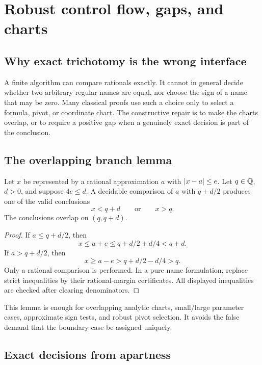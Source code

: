 \section{Robust control flow, gaps, and charts}
\label{sec:control}

\subsection{Why exact trichotomy is the wrong interface}

A finite algorithm can compare rationals exactly.  It cannot in general decide
whether two arbitrary regular names are equal, nor choose the sign of a name
that may be zero.  Many classical proofs use such a choice only to select a
formula, pivot, or coordinate chart.  The constructive repair is to make the
charts overlap, or to require a positive gap when a genuinely exact decision
is part of the conclusion.

\subsection{The overlapping branch lemma}

\begin{theorem}
\label{thm:overlap-branch}
Let \(x\) be represented by a rational approximation \(a\) with
\(\left|x-a\right|\le e\).  Let \(q\in\mathbb Q\), \(d>0\), and suppose \(4e\le d\).
A decidable comparison of \(a\) with \(q+d/2\) produces one of the valid
conclusions
\[
 x<q+d\qquad\text{or}\qquad x>q.
\]
The conclusions overlap on \((q,q+d)\).
\end{theorem}

\begin{proof}
If \(a\le q+d/2\), then
\[
 x\le a+e\le q+d/2+d/4<q+d.
\]
If \(a>q+d/2\), then
\[
 x\ge a-e>q+d/2-d/4>q.
\]
Only a rational comparison is performed.  In a pure name formulation, replace
strict inequalities by their rational-margin certificates.  All displayed
inequalities are checked after clearing denominators.
\end{proof}

This lemma is enough for overlapping analytic charts, small/large parameter
cases, approximate sign tests, and robust pivot selection.  It avoids the
false demand that the boundary case be assigned uniquely.

\subsection{Exact decisions from apartness}

